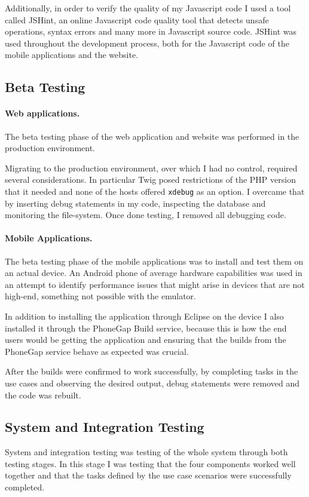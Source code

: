 \documentclass[12pt]{ecsproject}     %
\begin{document}
Additionally, in order to verify the quality of my Javascript code I used a tool called JSHint, an online Javascript code quality tool that detects unsafe operations, syntax errors and many more in Javascript source code. JSHint was used throughout the development process, both for the Javascript code of the mobile applications and the website.

\subsection{Beta Testing}
\paragraph{Web applications.}
The beta testing phase of the web application and website was performed in the production environment.

Migrating to the production environment, over which I had no control, required several considerations. In particular Twig posed restrictions of the PHP version that it needed and none of the hosts offered \texttt{xdebug} as an option. I overcame that by inserting debug statements in my code, inspecting the database and monitoring the file-system. Once done testing, I removed all debugging code.

\paragraph{Mobile Applications.}
The beta testing phase of the mobile applications was to install and test them on an actual device. An Android phone of average hardware capabilities was used in an attempt to identify performance issues that might arise in devices that are not high-end, something not possible with the emulator.

In addition to installing the application through Eclipse on the device I also installed it through the PhoneGap Build service, because this is how the end users would be getting the application and ensuring that the builds from the PhoneGap service behave as expected was crucial.

After the builds were confirmed to work successfully, by completing tasks in the use cases and observing the desired output, debug statements were removed and the code was rebuilt.

\subsection{System and Integration Testing}
System and integration testing was testing of the whole system through both testing stages. In this stage I was testing that the four components worked well together and that the tasks defined by the use case scenarios were successfully completed. 
\end{document}
